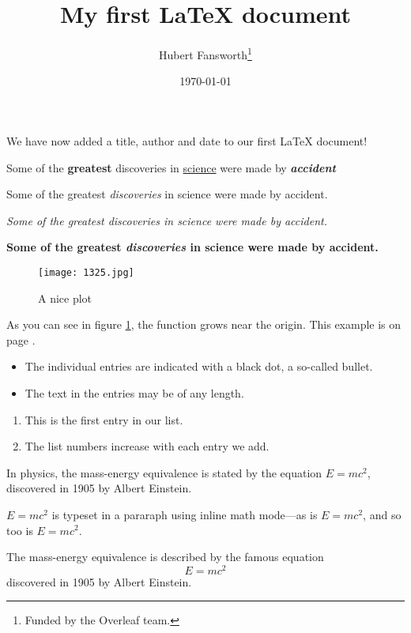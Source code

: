 \documentclass[12pt, letterpaper]{article}
\title{My first LaTeX document}
\author{Hubert Fansworth\thanks{Funded by the Overleaf team.}}
\date{\today}
\begin{document}
\maketitle

\tableofcontents

We have now added a title, author and date to our first \LaTeX{} document!

Some of the \textbf{greatest}
discoveries in \underline{science}
were made by \textbf{\textit{accident}}

Some of the greatest \emph{discoveries} in science
were made by accident.

\textit{Some of the greatest \emph{discoveries}
in science were made by accident.}

\textbf{Some of the greatest \emph{discoveries}
in science were made by accident.}

\begin{figure}[h]
    \centering
    \texttt{[image: 1325.jpg]}
    \caption{A nice plot}
    \label{fig:meshl}
\end{figure}

As you can see in figure \ref{fig:meshl}, the function grows near the
origin. This example is on page \pageref{fig:meshl}.

\begin{itemize}
    \item The individual entries are indicated with a black dot, a so-called
bullet.
    \item The text in the entries may be of any length.
\end{itemize}

\begin{enumerate}
    \item This is the first entry in our list.
    \item The list numbers increase with each entry we add.
\end{enumerate}

In physics, the mass-energy equivalence is stated
by the equation $E=mc^2$, discovered in 1905 by Albert Einstein.

\begin{math}
    E=mc^2
\end{math} is typeset in a pararaph using inline math mode---as is 
$E=mc^2$, and so too is \(E=mc^2\).

The mass-energy equivalence is described by the famous equation
\[ E=mc^2 \] discovered in 1905 by Albert Einstein.
\end{document}
